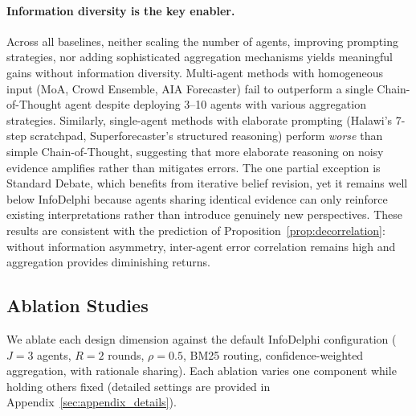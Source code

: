\documentclass[11pt]{article}
\theoremstyle{plain}
\theoremstyle{definition}
\begin{document}
\paragraph{ Information diversity is the key enabler.}
Across all baselines, neither scaling the number of agents, improving prompting strategies, nor adding sophisticated aggregation mechanisms yields meaningful gains without information diversity.
Multi-agent methods with homogeneous input (MoA, Crowd Ensemble, AIA Forecaster) fail to outperform a single Chain-of-Thought agent despite deploying 3--10 agents with various aggregation strategies.
Similarly, single-agent methods with elaborate prompting (Halawi's 7-step scratchpad, Superforecaster's structured reasoning) perform \textit{worse} than simple Chain-of-Thought, suggesting that more elaborate reasoning on noisy evidence amplifies rather than mitigates errors.
The one partial exception is Standard Debate, which benefits from iterative belief revision, yet it remains well below InfoDelphi because agents sharing identical evidence can only reinforce existing interpretations rather than introduce genuinely new perspectives.
These results are consistent with the prediction of Proposition~\ref{prop:decorrelation}: without information asymmetry, inter-agent error correlation remains high and aggregation provides diminishing returns.

\subsection{Ablation Studies}
\label{sec:ablation}

We ablate each design dimension against the default InfoDelphi configuration
($J{=}3$ agents, $R{=}2$ rounds, $\rho{=}0.5$, BM25 routing, confidence-weighted aggregation, with rationale sharing).
Each ablation varies one component while holding others fixed (detailed settings are provided in Appendix~\ref{sec:appendix_details}).
\end{document}

